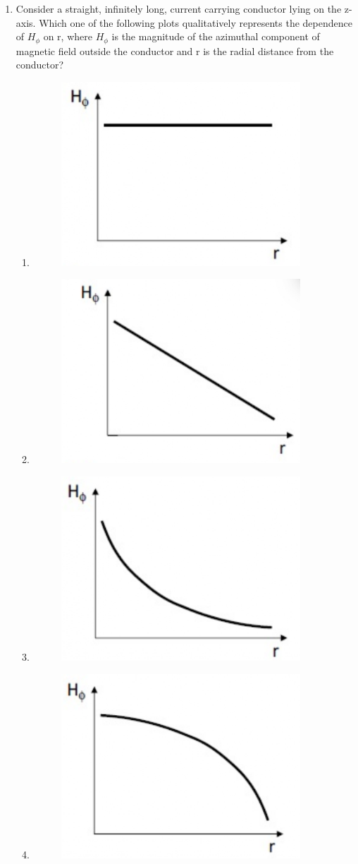 \documentclass[a4paper, 11pt]{article}
\begin{document}
\begin{enumerate}
    \item Consider a straight, infinitely long, current carrying conductor lying on the z-axis. Which one of the following plots  qualitatively represents the dependence of $H_{\phi}$ on r, where $H_{\phi}$ is the magnitude of the azimuthal component of magnetic field outside the conductor and r is the radial distance from the conductor?
    \begin{enumerate}
        \item \begin{figure}[H]\centering\includegraphics[width=0.4\columnwidth]{figs/q34A.png}\end{figure}
        \item \begin{figure}[H]\centering\includegraphics[width=0.4\columnwidth]{figs/q34B.png}\end{figure}
        \item \begin{figure}[H]\centering\includegraphics[width=0.4\columnwidth]{figs/q34C.png}\end{figure}
        \item \begin{figure}[H]\centering\includegraphics[width=0.4\columnwidth]{figs/q34D.png}\end{figure}
    \end{enumerate}
    

\end{enumerate}
\end{document}
